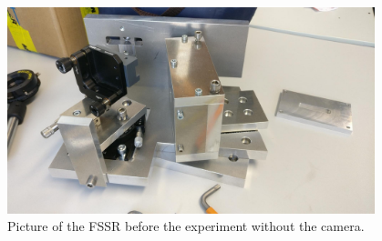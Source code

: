 \begin{figure}[H]
	\centering
	\includegraphics[width = 0.95\textwidth]{InventorPics/Real_pic_FSSR.jpeg}
	\caption{Picture of the FSSR before the experiment without the camera.}
\end{figure}




